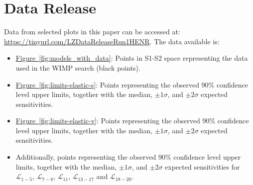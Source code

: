 \documentclass[reprint, showpacs,
preprintnumbers,
amsmath,amssymb,
aps, floatfix,
superscriptaddress,
prd, nofootinbib]{revtex4-1}
\begin{document}


\appendix
\section{Data Release\label{ap:2}}
Data from selected plots in this paper can be accessed at: \href{https://tinyurl.com/LZDataReleaseRun1HENR}{https://tinyurl.com/LZDataReleaseRun1HENR}.
The data available is:
\begin{itemize}
    \item[--] \hyperref[fig:models_with_data]{Figure~\ref*{fig:models_with_data}}: Points in S1-S2 space representing the data used in the WIMP search (black points).
    \item[--] \hyperref[fig:limits-elastic-s]{Figure~\ref*{fig:limits-elastic-s}}: Points representing the observed 90\% confidence level upper limits, together with the median, $\pm1\sigma$, and $\pm2\sigma$ expected sensitivities.
    \item[--] \hyperref[fig:limits-elastic-v]{Figure~\ref*{fig:limits-elastic-v}}: Points representing the observed 90\% confidence level upper limits, together with the median, $\pm1\sigma$, and $\pm2\sigma$ expected sensitivities.
    \item[--] Additionally, points representing the observed 90\% confidence level upper limits, together with the median, $\pm1\sigma$, and $\pm2\sigma$ expected sensitivities for $\mathcal{L}_{1-5}$, $\mathcal{L}_{7-8}$, $\mathcal{L}_{11}$, $\mathcal{L}_{13-17}$ and $\mathcal{L}_{19-20}$.
\end{itemize}
\end{document}
